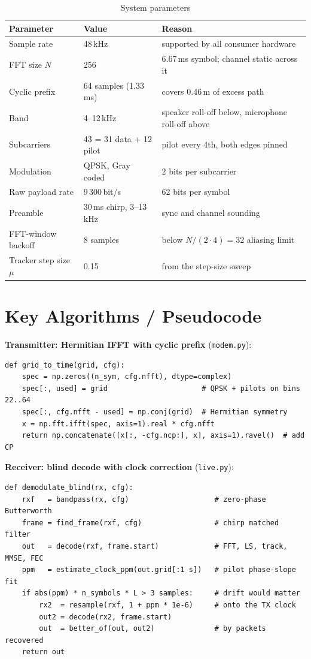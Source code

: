 \documentclass[11pt,a4paper]{report}
\begin{document}
\begin{table}[htbp]
\centering
\small
\begin{tabular}{|l|l|l|}
\hline
\textbf{Parameter} & \textbf{Value} & \textbf{Reason} \\
\hline
Sample rate & 48\,kHz & supported by all consumer hardware \\
FFT size $N$ & 256 & 6.67\,ms symbol; channel static across it \\
Cyclic prefix & 64 samples (1.33\,ms) & covers 0.46\,m of excess path \\
Band & 4--12\,kHz & speaker roll-off below, microphone roll-off above \\
Subcarriers & 43 = 31 data + 12 pilot & pilot every 4th, both edges pinned \\
Modulation & QPSK, Gray coded & 2 bits per subcarrier \\
Raw payload rate & 9\,300\,bit/s & 62 bits per symbol \\
Preamble & 30\,ms chirp, 3--13\,kHz & sync and channel sounding \\
FFT-window backoff & 8 samples & below $N/(2\cdot 4)=32$ aliasing limit \\
Tracker step size $\mu$ & 0.15 & from the step-size sweep \\
\hline
\end{tabular}
\caption{System parameters}
\end{table}

\section{Key Algorithms / Pseudocode}

\textbf{Transmitter: Hermitian IFFT with cyclic prefix} (\texttt{modem.py}):
\begin{verbatim}
def grid_to_time(grid, cfg):
    spec = np.zeros((n_sym, cfg.nfft), dtype=complex)
    spec[:, used] = grid                      # QPSK + pilots on bins 22..64
    spec[:, cfg.nfft - used] = np.conj(grid)  # Hermitian symmetry
    x = np.fft.ifft(spec, axis=1).real * cfg.nfft
    return np.concatenate([x[:, -cfg.ncp:], x], axis=1).ravel()  # add CP
\end{verbatim}

\textbf{Receiver: blind decode with clock correction} (\texttt{live.py}):
\begin{verbatim}
def demodulate_blind(rx, cfg):
    rxf   = bandpass(rx, cfg)                    # zero-phase Butterworth
    frame = find_frame(rxf, cfg)                 # chirp matched filter
    out   = decode(rxf, frame.start)             # FFT, LS, track, MMSE, FEC
    ppm   = estimate_clock_ppm(out.grid[:1 s])   # pilot phase-slope fit
    if abs(ppm) * n_symbols * L > 3 samples:     # drift would matter
        rx2  = resample(rxf, 1 + ppm * 1e-6)     # onto the TX clock
        out2 = decode(rx2, frame.start)
        out  = better_of(out, out2)              # by packets recovered
    return out
\end{verbatim}
\end{document}

